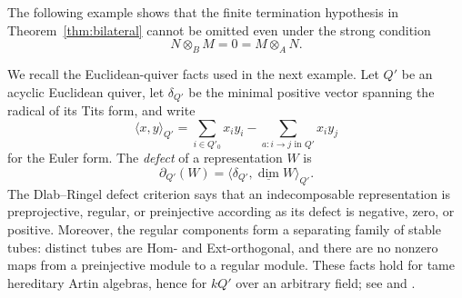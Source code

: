 \documentclass[11pt,reqno]{amsart}
\theoremstyle{definition}
\theoremstyle{remark}
\numberwithin{equation}{section}
\begin{document}
The following example shows that the finite termination hypothesis in
Theorem~\ref{thm:bilateral} cannot be omitted even under the strong condition
\[
 N\otimes_B M=0=M\otimes_A N.
\]

We recall the Euclidean-quiver facts used in the next example.  Let $Q'$ be
an acyclic Euclidean quiver, let $\delta_{Q'}$ be the minimal positive vector
spanning the radical of its Tits form, and write
\[
 \langle x,y\rangle_{Q'}
 =\sum_{i\in Q'_0}x_iy_i-
   \sum_{a:i\to j\text{ in }Q'}x_iy_j
\]
for the Euler form.  The \emph{defect} of a representation $W$ is
\[
 \partial_{Q'}(W)=
 \langle\delta_{Q'},\underline{\dim}W\rangle_{Q'}.
\]
The Dlab--Ringel defect criterion says that an indecomposable representation
is preprojective, regular, or preinjective according as its defect is negative,
zero, or positive.  Moreover, the regular components form a separating family
of stable tubes: distinct tubes are Hom- and Ext-orthogonal, and there are no
nonzero maps from a preinjective module to a regular module.  These facts hold
for tame hereditary Artin algebras, hence for $kQ'$ over an arbitrary field; see
\cite[Sections~1, 3 and~6]{DlabRingel} and
\cite[Section~3, Case~1]{Ringel}.
\end{document}
